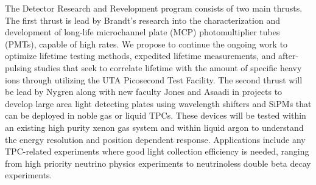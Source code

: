 The Detector Research and Revelopment program consists of two main thrusts. The first thrust is lead by Brandt’s research into the characterization and 
development of long-life microchannel plate (MCP) photomultiplier tubes (PMTs), capable of high rates. We propose to continue the ongoing work to optimize 
lifetime testing methods, expedited lifetime measurements, and after-pulsing studies that seek to correlate lifetime with the amount of specific heavy ions 
through utilizing the UTA Picosecond Test Facility. 
The second thrust will be lead by Nygren along with new faculty Jones and Asaadi in projects to develop large area light 
detecting plates using wavelength shifters and SiPMs that can be deployed in noble gas or liquid TPCs. These devices will be tested within an existing high 
purity xenon gas system and within liquid argon to understand the energy resolution and position dependent response. Applications include any TPC-related 
experiments where good light collection efficiency is needed, ranging from high priority neutrino physics experiments to neutrinoless double beta decay 
experiments.